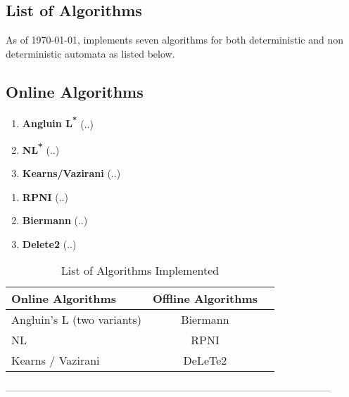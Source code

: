 \subsection{List of Algorithms}

As of \today, \libalf implements seven algorithms for both deterministic and non deterministic automata as listed below.

\subsection*{Online Algorithms}

\begin{enumerate}
 \item \textbf{Angluin L\textsuperscript{*}} \cite{36889-angluin1} \cite{181015-angluin2} \cite{640230-angluin3}
	(..)
 \item \textbf{NL\textsuperscript{*}} \cite{DBLP:conf/ijcai/BolligHKL09-nl1} \cite{DBLP:conf/wia/GarciaRCA05-nl2}
	(..)
 \item \textbf{Kearns/Vazirani} \cite{DBLP:conf/nips/CrammerKW06-Kearns1} \cite{DBLP:conf/nips/LittmanKS01-kearns2} \cite{200548-kearns3}
	(..)
\end{enumerate}

\begin{enumerate}
 \item \textbf{RPNI} \cite{DBLP:conf/aia/Hoffmann07-rpni1} \cite{599647-rpni2} \cite{655948-rpni3} \cite{1434324-rpni4}
	(..)
 \item \textbf{Biermann} \cite{17952-biermann1}
	(..)
 \item \textbf{Delete2} \cite{982366-delete1}
	(..)
\end{enumerate}


\begin{table} [h]
\centering
\begin{tabular}[c]{lcr}
\toprule[1pt]
Online Algorithms & Offline Algorithms \\	
\midrule
Angluin's L (two variants) & Biermann \\
NL & RPNI \\
Kearns / Vazirani & DeLeTe2 \\
\bottomrule[1pt]
\end{tabular}
\caption{List of Algorithms Implemented}
\label{algtables1}
\end{table}

---------------------------------------------------------------------------------------------------

